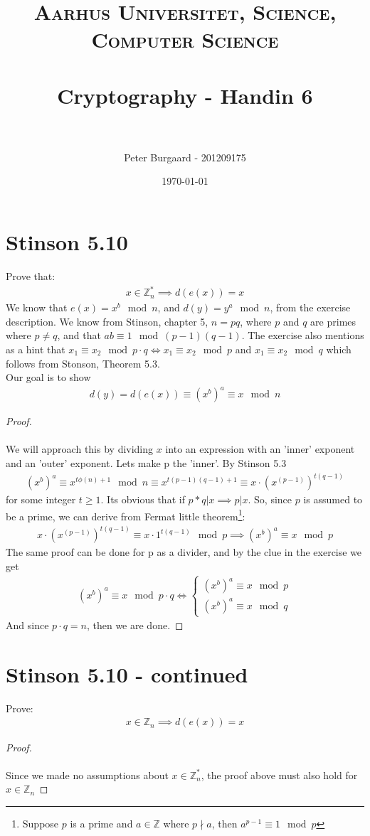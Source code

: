\documentclass[paper=a4, fontsize=11pt]{scrartcl} %
\title{	
	\normalfont \normalsize 
	\textsc{Aarhus Universitet, Science, Computer Science} \\ [25pt] %
	\horrule{0.5pt} \\[0.4cm] %
	\huge Cryptography - Handin 6 \\ %
	\horrule{2pt} \\[0.5cm] %
}
\author{Peter Burgaard - 201209175} %
\date{\normalsize\today} %
\numberwithin{equation}{section} %
\numberwithin{figure}{section} %
\numberwithin{table}{section} %
\begin{document}
\maketitle

\section{Stinson 5.10}

Prove that:
\begin{align*}
	 x\in \mathbb{Z}_n^*\implies d(e(x))=x
\end{align*}
We know that $e(x)=x^b\mod{n}$, and $d(y)=y^a\mod{n}$, from the exercise description. We know from Stinson, chapter 5, $n=pq$, where $p$ and $q$ are primes where $p\neq q$, and that $ab\equiv1\mod{(p-1)(q-1)}$. The exercise also mentions as a hint that $x_1\equiv x_2\mod{p\cdot q} \iff x_1\equiv x_2\mod{p}$ and $x_1\equiv x_2\mod{q}$ which follows from Stonson, Theorem 5.3. \\

Our goal is to show
\begin{align*}
	d(y)=d(e(x))\equiv \left( x^b\right) ^a\equiv x \mod{n}
\end{align*}
\begin{proof}
	\hspace{1cm} \\ \\
We will approach this by dividing $x$ into an expression with an 'inner' exponent and an 'outer' exponent. Lets make p the 'inner'. By Stinson 5.3
\begin{align*}
	\left( x^b\right) ^a\equiv x^{t\phi(n)+1}\mod{n}\equiv x^{t(p-1)(q-1)+1}\equiv x\cdot \left( x^{(p-1)}\right) ^{t(q-1)}
\end{align*}
for some integer $t\geq1$. Its obvious that if $p*q|x\implies p|x$. So, since $p$ is assumed to be a prime, we can derive from Fermat little theorem\footnote{Suppose $p$ is a prime and $a\in\mathbb{Z}$ where $p\nmid a$, then $a^{p-1}\equiv 1\mod{p}$}:
\begin{align*}
	x\cdot\left( x^{(p-1)}\right) ^{t(q-1)}\equiv x\cdot 1^{t(q-1)}\mod{p} \implies \left( x^b\right) ^a\equiv x \mod{p}
\end{align*}
The same proof can be done for  p as a divider, and by the clue in the exercise we get
\begin{align*}
\left( x^b\right) ^a\equiv x \mod{p\cdot q} \iff
\begin{cases}
\left( x^b\right) ^a\equiv x \mod{p} \\
\left( x^b\right) ^a\equiv x \mod{q} 
\end{cases} 
\end{align*}
And since $p\cdot q=n$, then we are done.
\end{proof}
\section{Stinson 5.10 - continued}
Prove:
\begin{align*}
	x \in \mathbb{Z}_n \implies d(e(x))=x
\end{align*}
\begin{proof}
	\hspace{1cm}\\\\
	Since we made no assumptions about $x\in \mathbb{Z}_n^*$, the proof above must also hold for $x\in\mathbb{Z}_n$
\end{proof}
\end{document}
